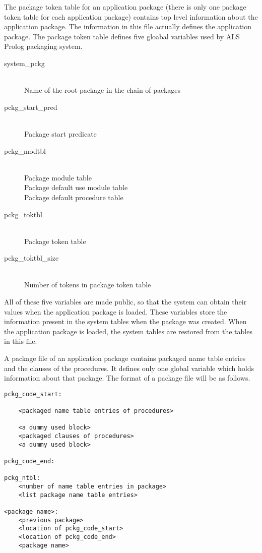 The package token table for an application package (there is only one
package token table for each application package) contains top level
information about the application package. The information in this file
actually defines the application package. The package token table 
defines five gloabal variables used by ALS Prolog packaging system.

\begin{description}
\item[system\_pckg] \ \\
Name of the root package in the chain of packages
\item[pckg\_start\_pred] \ \\
Package start predicate
\item[pckg\_modtbl] \ \\
Package module table\\
Package default use module table\\
Package default procedure table\\
\item[pckg\_toktbl] \ \\
Package token table
\item[pckg\_toktbl\_size] \ \\
Number of tokens in package token table
\end{description}

All of these five variables are made public, so that the system can obtain their
values when the application package is loaded.
These variables store the information present in the system tables when the package was created.
When the application package is loaded, the system tables are restored
from the tables in this file.

A package file of an application package contains packaged name table
entries and the clauses of the procedures. It defines only one global variable
which holds information about that package. The format of a package
file will be as follows.

\begin{verbatim}
pckg_code_start:

	<packaged name table entries of procedures>

	<a dummy used block>
	<packaged clauses of procedures>
	<a dummy used block>

pckg_code_end:

pckg_ntbl:
	<number of name table entries in package>
	<list package name table entries>

<package name>:
	<previous package>
	<location of pckg_code_start>
	<location of pckg_code_end>
	<package name>
\end{verbatim}

